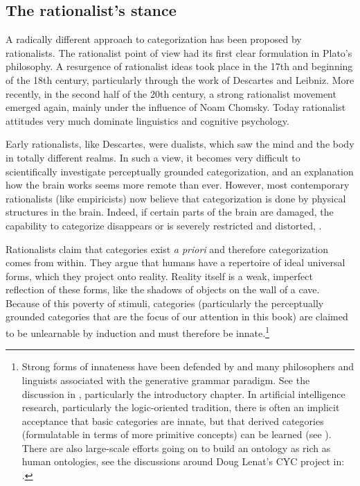 \subsection{The rationalist's stance}

A radically different approach to categorization has been 
proposed by rationalists. 
The rationalist point of view had its first clear formulation 
in Plato's philosophy. A resurgence of rationalist ideas
took place in the 17th and beginning of the
18th century, particularly through the work of 
Descartes and Leibniz. More recently, in the second half of
the 20th century, a strong rationalist movement
emerged again, mainly under the influence of Noam
Chomsky. Today rationalist attitudes very much 
dominate linguistics and cognitive psychology. 

Early rationalists, like Descartes, were dualists, which
saw the mind and the body in totally different realms. 
In such a view, it becomes very difficult to scientifically investigate 
perceptually grounded categorization, and an explanation 
how the brain works seems more remote than ever. However, 
most contemporary rationalists (like empiricists)
now believe that categorization
is done by physical structures in the brain. Indeed, 
if certain parts of the brain are damaged, the capability 
to categorize disappears or is severely restricted and 
distorted, \cite{Deacon:1998}. 

Rationalists claim that categories 
exist {\itshape a priori} and therefore categorization comes from
within. They argue that humans have a repertoire of ideal universal
forms, which they project
onto reality. Reality itself is a weak, imperfect 
reflection of these forms, like the shadows of objects
on the wall of a cave. Because of this poverty of stimuli, 
categories (particularly the perceptually grounded
categories that are the focus of our attention in this 
book) are claimed to be unlearnable by induction and must
therefore be innate.\footnote{
Strong forms of innateness have been defended by 
\cite{Fodor:1983}
and many philosophers and linguists associated with the 
generative grammar paradigm. See the discussion in
\cite{Wierzbicka:1992}, particularly the introductory chapter. 
In artificial intelligence 
research, particularly the logic-oriented tradition, there
is often an implicit acceptance that basic categories 
are innate, but that derived categories (formulatable
in terms of more primitive concepts) can be learned
(see \cite{McCarthy:2008}). There are also 
large-scale efforts going on to build an ontology as 
rich as human ontologies, see the discussions around
Doug Lenat's CYC project in: \cite{Steels:1994}.}

